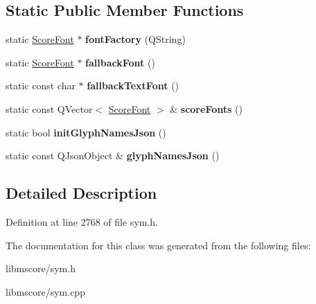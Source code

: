 \subsection*{Static Public Member Functions}
\begin{DoxyCompactItemize}
\item 
\mbox{\label{class_ms_1_1_score_font_a3961745e9d8ad69188ec511dc7f9b21f}} 
static \hyperlink{class_ms_1_1_score_font}{Score\+Font} $\ast$ {\bfseries font\+Factory} (Q\+String)
\item 
\mbox{\label{class_ms_1_1_score_font_abab7802f77dadf7757d04970f4b29058}} 
static \hyperlink{class_ms_1_1_score_font}{Score\+Font} $\ast$ {\bfseries fallback\+Font} ()
\item 
\mbox{\label{class_ms_1_1_score_font_adf555a1377ae426a8bd2872644b0ece2}} 
static const char $\ast$ {\bfseries fallback\+Text\+Font} ()
\item 
\mbox{\label{class_ms_1_1_score_font_a9a0c36d65062dafafa932714bc43c494}} 
static const Q\+Vector$<$ \hyperlink{class_ms_1_1_score_font}{Score\+Font} $>$ \& {\bfseries score\+Fonts} ()
\item 
\mbox{\label{class_ms_1_1_score_font_a1f7d7148815f4e3513cbb45933c1f223}} 
static bool {\bfseries init\+Glyph\+Names\+Json} ()
\item 
\mbox{\label{class_ms_1_1_score_font_a25a74f4b5612db1e770fc705ccf57a6b}} 
static const Q\+Json\+Object \& {\bfseries glyph\+Names\+Json} ()
\end{DoxyCompactItemize}


\subsection{Detailed Description}


Definition at line 2768 of file sym.\+h.



The documentation for this class was generated from the following files\+:\begin{DoxyCompactItemize}
\item 
libmscore/sym.\+h\item 
libmscore/sym.\+cpp\end{DoxyCompactItemize}
